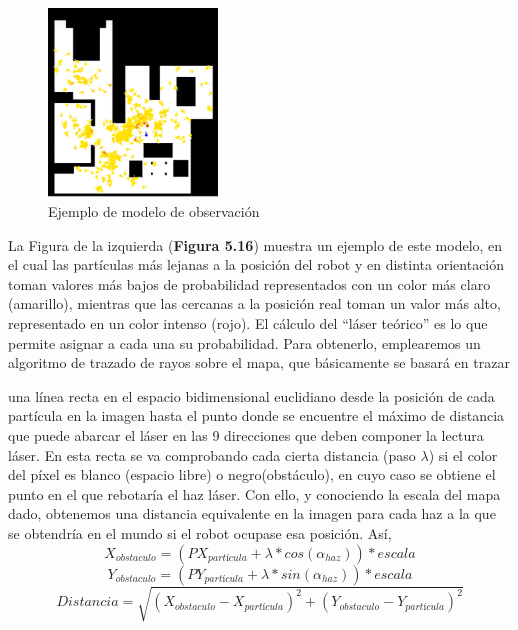 \begin{multicols}{2}
	\begin{figure}[H]
	\begin{center}
		\includegraphics[width=0.4\textwidth]{figures/modeloobsv.png}
		\caption{Ejemplo de modelo de observación}
		\label{fig.modeloobsv}
		\end{center}
	\end{figure}
La Figura de la izquierda (\textbf{Figura 5.16}) muestra un ejemplo de este modelo, en el cual las partículas más lejanas a la posición del robot y en distinta orientación toman valores más bajos de probabilidad representados con un color más claro (amarillo), mientras que las cercanas a la posición real toman un valor más alto, representado en un color intenso (rojo). El cálculo del “láser teórico” es lo que permite asignar a cada una su probabilidad. Para obtenerlo, emplearemos un algoritmo de trazado de rayos sobre el mapa, que básicamente se basará en trazar
\end{multicols} una línea recta en el espacio bidimensional euclidiano desde la posición de cada partícula en la imagen hasta el punto donde se encuentre el máximo de distancia que puede abarcar el láser en las 9 direcciones que deben componer la lectura láser. En esta recta se va comprobando cada cierta distancia (paso $\lambda$) si el color del píxel es blanco (espacio libre) o negro(obstáculo), en cuyo caso se obtiene el punto en el que rebotaría el haz láser. Con ello, y conociendo la escala del mapa dado, obtenemos una distancia equivalente en la imagen para cada haz a la que se obtendría en el mundo si el robot ocupase esa posición. Así, 
\begin{equation}
X_{obstaculo} = (PX_{partícula} + \lambda*cos(\alpha_{haz}))*escala
\end{equation}
\begin{equation}
Y_{obstaculo} = (PY_{partícula} + \lambda*sin(\alpha_{haz}))*escala
\end{equation}
\begin{equation}
Distancia = \sqrt{(X_{obstaculo}-X_{partícula})^2+(Y_{obstaculo}-Y_{partícula})^2}
\end{equation}

